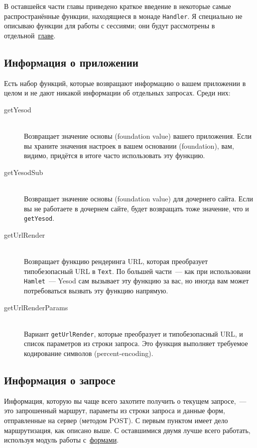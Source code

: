 В оставшейся части главы приведено краткое введение в некоторые
самые распространённые функции, находящиеся в монаде
\lstinline!Handler!. Я специально не описываю функции для работы с
сессиями; они будут рассмотрены в отдельной~\hyperref[chap:sessions]{главе}.

\subsection{Информация о приложении}
Есть набор функций, которые возвращают информацию о вашем приложении в
целом и не дают никакой информации об отдельных запросах. Среди них:
\begin{description}
\item[getYesod] \hfill \\
Возвращает значение основы (foundation value) вашего приложения. Если вы
храните значения настроек в вашем основании (foundation), вам, видимо,
придётся в итоге часто использовать эту функцию.

\item[getYesodSub] \hfill \\
Возвращает значение основы (foundation value) для дочернего сайта. Если вы
не работаете в дочернем сайте, будет возвращать тоже значение, что и
\lstinline!getYesod!.

\item[getUrlRender] \hfill \\
Возвращает функцию рендеринга URL, которая преобразует типобезопасный
URL в \lstinline!Text!. По большей части~--- как при использовани
\lstinline!Hamlet!~--- Yesod сам вызывает эту функцию за вас, но иногда
вам может потребоваться вызвать эту функцию напрямую.

\item[getUrlRenderParams]  \hfill \\
Вариант \lstinline!getUrlRender!, которые преобразует и
типобезопасный URL, и список параметров из строки запроса. Это функция
выполняет требуемое кодирование символов (percent-encoding).
\end{description}

\subsection{Информация о запросе}
Информация, которую вы чаще всего захотите получить о текущем
запросе,~--- это запрошенный маршрут, параметы из строки запроса и
данные форм, отправленные на сервер (методом POST). С первым пунктом имеет
дело маршрутизация, как описано выше. С оставшимися двумя лучше всего
работать, используя модуль работы с~\hyperref[chap:forms]{формами}.

